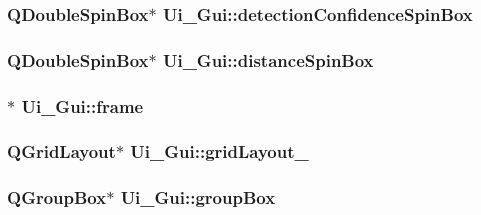 \label{classUi__Gui_a700c0982fcedc0bc21592250f8880bfc}
\hypertarget{classUi__Gui_a443cf0db8cdc01eeefba083e505e3ccb}{
\subsubsection[{detectionConfidenceSpinBox}]{\setlength{\rightskip}{0pt plus 5cm}QDoubleSpinBox$\ast$ {\bf Ui\_\-Gui::detectionConfidenceSpinBox}}}
\label{classUi__Gui_a443cf0db8cdc01eeefba083e505e3ccb}
\hypertarget{classUi__Gui_a99c57feafa92582a923104e8bd86f235}{
\subsubsection[{distanceSpinBox}]{\setlength{\rightskip}{0pt plus 5cm}QDoubleSpinBox$\ast$ {\bf Ui\_\-Gui::distanceSpinBox}}}
\label{classUi__Gui_a99c57feafa92582a923104e8bd86f235}
\hypertarget{classUi__Gui_abd3574b36c218e51e56354b5336ab146}{
\subsubsection[{frame}]{$\ast$ {\bf Ui\_\-Gui::frame}}}
\label{classUi__Gui_abd3574b36c218e51e56354b5336ab146}
\hypertarget{classUi__Gui_afa1d273753f4848f9b6625c81fb13d7f}{
\subsubsection[{gridLayout\_\-2}]{\setlength{\rightskip}{0pt plus 5cm}QGridLayout$\ast$ {\bf Ui\_\-Gui::gridLayout\_}}}
\label{classUi__Gui_afa1d273753f4848f9b6625c81fb13d7f}
\hypertarget{classUi__Gui_ae972e63a61b86d36c9613f1347b1a0b7}{
\subsubsection[{groupBox}]{\setlength{\rightskip}{0pt plus 5cm}QGroupBox$\ast$ {\bf Ui\_\-Gui::groupBox}}}
\label{classUi__Gui_ae972e63a61b86d36c9613f1347b1a0b7}
